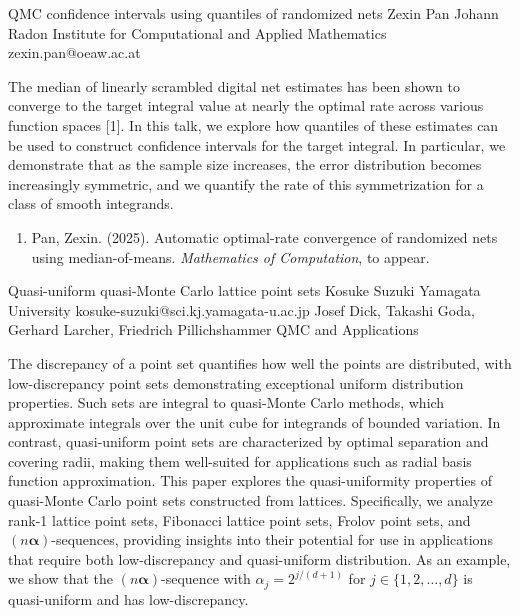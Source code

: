 \begin{talk}
  {QMC confidence intervals using quantiles of randomized nets}%
  {Zexin Pan}%
  {Johann Radon Institute for Computational and Applied Mathematics}%
  {zexin.pan@oeaw.ac.at}%
  {}%
  
    


The median of linearly scrambled digital net estimates has been shown to converge to the target integral value at nearly the optimal rate across various function spaces [1]. In this talk, we explore how quantiles of these estimates can be used to construct confidence intervals for the target integral. In particular, we demonstrate that as the sample size increases, the error distribution becomes increasingly symmetric, and we quantify the rate of this symmetrization for a class of smooth integrands.
            
\medskip


\begin{enumerate}
 \item[{[1]}] Pan, Zexin. (2025). Automatic optimal-rate convergence of randomized nets using median-of-means. {\it  Mathematics of Computation}, to appear.
\end{enumerate}

\end{talk}

\begin{talk}
  {Quasi-uniform quasi-Monte Carlo lattice point sets}%
  {Kosuke Suzuki}%
  {Yamagata University}%
  {kosuke-suzuki@sci.kj.yamagata-u.ac.jp}%
  {Josef Dick, Takashi Goda, Gerhard Larcher, Friedrich Pillichshammer}%
  {QMC and Applications}%
    
   

The discrepancy of a point set quantifies how well the points are distributed, with low-discrepancy point sets demonstrating exceptional uniform distribution properties. Such sets are integral to quasi-Monte Carlo methods, which approximate integrals over the unit cube for integrands of bounded variation. In contrast, quasi-uniform point sets are characterized by optimal separation and covering radii, making them well-suited for applications such as radial basis function approximation. This paper explores the quasi-uniformity properties of quasi-Monte Carlo point sets constructed from lattices. Specifically, we analyze rank-1 lattice point sets, Fibonacci lattice point sets, Frolov point sets, and $(n \boldsymbol{\alpha})$-sequences, providing insights into their potential for use in applications that require both low-discrepancy and quasi-uniform distribution. As an example, we show that the $(n \boldsymbol{\alpha})$-sequence with $\alpha_j = 2^{j/(d+1)}$ for $j \in \{1, 2, \ldots, d\}$ is quasi-uniform and has low-discrepancy.


\end{talk}
